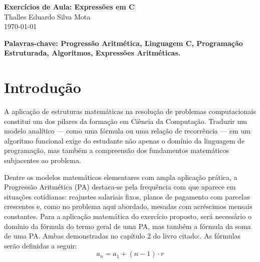 \documentclass[12pt, a4paper]{article}
\newcommand{\NomeAluno}{Thalles Eduardo Silva Mota}             %
\begin{document}
\begin{center}
  {\Large\bfseries\color{ufmtAzul} Exercícios de Aula: Expressões em C}\\[6pt]
  {\large \NomeAluno}\\[3pt]
  {\normalsize\color{ufmtCinza} \today}
\end{center}

\vspace{0.5cm}

\begin{abstract}
    \textbf{Este exercício apresenta a resolução do problema da mesada de Joãozinho 
    na linguagem C, no qual um valor inicial é acrescido de uma quantia fixa a 
    cada mês, formando uma Progressão Aritmética (PA). A implementação utiliza 
    as fórmulas do termo geral e da soma de uma PA para calcular o valor recebido 
    no último mês, o total acumulado e a média mensal. O programa demonstra 
    conceitos fundamentais de programação estruturada na linguagem C, como declaração 
    e tipagem de variáveis, leitura de dados, construção de expressões aritméticas 
    e formatação de saída, evidenciando a integração entre raciocínio matemático 
    e desenvolvimento de algoritmos.}
\end{abstract}

\noindent\textbf{Palavras-chave: Progressão Aritmética, Linguagem C, Programação 
Estruturada, Algoritmos, Expressões Aritméticas.}

\section*{Introdução}
    A aplicação de estruturas matemáticas na resolução de problemas computacionais 
    constitui um dos pilares da formação em Ciência da Computação. Traduzir um modelo 
    analítico — como uma fórmula ou uma relação de recorrência — em um algoritmo 
    funcional exige do estudante não apenas o domínio da linguagem de programação, 
    mas também a compreensão dos fundamentos matemáticos subjacentes ao problema.


Dentre os modelos matemáticos elementares com ampla aplicação prática, a Progressão 
Aritmética (PA) destaca-se pela frequência com que aparece em situações cotidianas: 
reajustes salariais fixos, planos de pagamento com parcelas crescentes e, como no 
problema aqui abordado, mesadas com acréscimos mensais constantes. Para a aplicação 
matemática do exercício proposto, será necessário o domínio da fórmula do termo geral 
de uma PA, mas também a fórmula da soma de uma PA. Ambas demonstradas no capítulo 
2 do livro citado:\cite{iezzi2013sequencias}. As fórmulas serão definidas a seguir:
\begin{equation}
  a_n = a_1 + (n-1) \cdot r
  \label{eq:termo-geral}
\end{equation}
\end{document}
